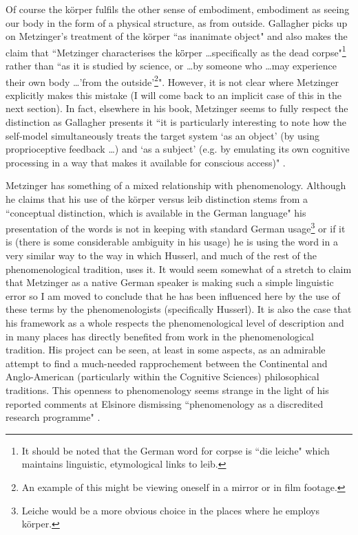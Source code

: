 Of course the k\"{o}rper fulfils the other sense of embodiment, embodiment as seeing our body in the form of a physical structure, as from outside. Gallagher picks up on Metzinger's treatment of the k\"{o}rper ``as inanimate object" \cite[p. 457]{metzinger2003} and also makes the claim that ``Metzinger characterises the k\"{o}̈rper \ldots specifically as the dead corpse"\footnote{It should be noted that the German word for corpse is ``die leiche" which maintains linguistic, etymological links to leib.} \cite[p. 3]{gallagher2005} rather than ``as it is studied by science, or \ldots by someone who \ldots may experience their own body \ldots 'from the outside'\footnote{An example of this might be viewing oneself in a mirror or in film footage.}"\cite[p. 3]{gallagher2005}. However, it is not clear where Metzinger explicitly makes this mistake (I will come back to an implicit case of this in the next section). In fact, elsewhere in his book, Metzinger seems to fully respect the distinction as Gallagher presents it ``it is particularly interesting to note how the self-model simultaneously treats the target system `as an object' (by using proprioceptive feedback \ldots ) and `as a subject' (e.g. by emulating its own cognitive processing in a way that makes it available for conscious access)" \cite[p. 301]{metzinger2003}.

Metzinger has something of a mixed relationship with phenomenology. Although he claims that his use of the k\"{o}rper versus leib distinction stems from a ``conceptual distinction, which is available in the German language" his presentation of the words is not in keeping with standard German usage\footnote{Leiche would be a more obvious choice in the places where he employs k\"{o}rper.} or if it is (there is some considerable ambiguity in his usage) he is using the word in a very similar way to the way in which Husserl, and much of the rest of the phenomenological tradition, uses it. It would seem somewhat of a stretch to claim that Metzinger as a native German speaker is making such a simple linguistic error so I am moved to conclude that he has been influenced here by the use of these terms by the phenomenologists (specifically Husserl). It is also the case that his framework as a whole respects the phenomenological level of description and in many places has directly benefited from work in the phenomenological tradition. His project can be seen, at least in some aspects, as an admirable attempt to find a much-needed rapprochement between the Continental and Anglo-American (particularly within the Cognitive Sciences) philosophical traditions. This openness to phenomenology seems strange in the light of his reported comments at Elsinore dismissing ``phenomenology as a discredited research programme" \citetext{\citealp[p.~2]{gallagher2008}; \citealp[p.~385]{metzinger1995faster}}.

